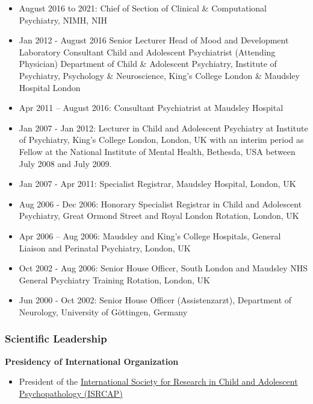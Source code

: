 \documentclass[
]{article}
\providecommand{\tightlist}{%
  \setlength{\itemsep}{0pt}\setlength{\parskip}{0pt}}
\begin{document}
\begin{itemize}
\tightlist
\item
  August 2016 to 2021: Chief of Section of Clinical \& Computational
  Psychiatry, NIMH, NIH
\item
  Jan 2012 - August 2016 Senior Lecturer Head of Mood and Development
  Laboratory Consultant Child and Adolescent Psychiatrist (Attending
  Physician) Department of Child \& Adolescent Psychiatry, Institute of
  Psychiatry, Psychology \& Neuroscience, King's College London \&
  Maudsley Hospital London
\item
  Apr 2011 -- August 2016: Consultant Psychiatrist at Maudsley Hospital
\item
  Jan 2007 - Jan 2012: Lecturer in Child and Adolescent Psychiatry at
  Institute of Psychiatry, King's College London, London, UK with an
  interim period as Fellow at the National Institute of Mental Health,
  Bethesda, USA between July 2008 and July 2009.
\item
  Jan 2007 - Apr 2011: Specialist Registrar, Maudsley Hospital, London,
  UK
\item
  Aug 2006 - Dec 2006: Honorary Specialist Registrar in Child and
  Adolescent Psychiatry, Great Ormond Street and Royal London Rotation,
  London, UK
\item
  Apr 2006 -- Aug 2006: Maudsley and King's College Hospitals, General
  Liaison and Perinatal Psychiatry, London, UK
\item
  Oct 2002 - Aug 2006: Senior House Officer, South London and Maudsley
  NHS General Psychiatry Training Rotation, London, UK
\item
  Jun 2000 - Oct 2002: Senior House Officer (Assistenzarzt), Department
  of Neurology, University of Göttingen, Germany
\end{itemize}

\hypertarget{scientific-leadership}{%
\subsubsection{Scientific Leadership}\label{scientific-leadership}}

\textbf{Presidency of International Organization}

\begin{itemize}
\tightlist
\item
  President of the
  \href{https://isrcap.org/executive-committee.html}{International
  Society for Research in Child and Adolescent Psychopathology (ISRCAP)}
\end{itemize}
\end{document}
